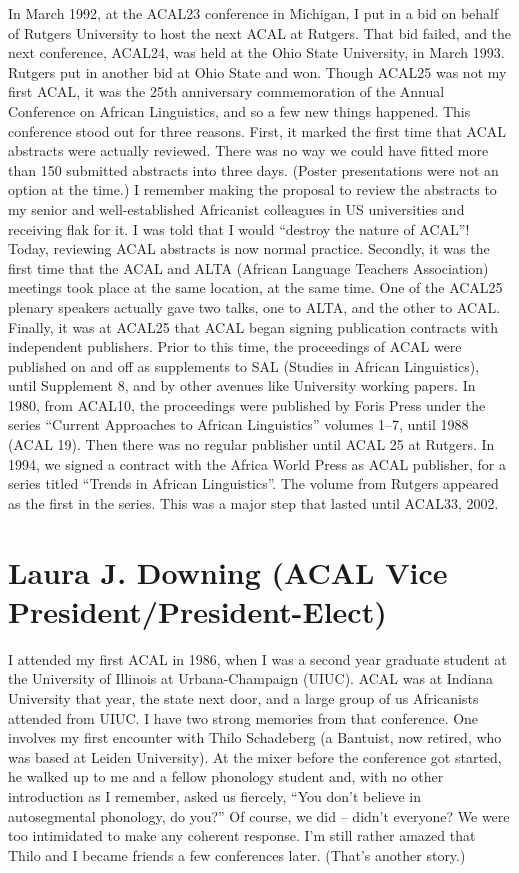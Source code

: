 \documentclass[output=paper]{langscibook}
\begin{document}
In March 1992, at the ACAL23 conference in Michigan, I put in a bid on behalf of Rutgers University to host the next ACAL at Rutgers. That bid failed, and the next conference, ACAL24, was held at the Ohio State University, in March 1993. Rutgers put in another bid at Ohio State and won.
Though ACAL25 was not my first ACAL, it was the 25th anniversary commemoration of the Annual Conference on African Linguistics, and so a few new things happened. This conference stood out for three reasons. First, it marked the first time that ACAL abstracts were actually reviewed. There was no way we could have fitted more than 150 submitted abstracts into three days. (Poster presentations were not an option at the time.) I remember making the proposal to review the abstracts to my senior and well-established Africanist colleagues in US universities and receiving flak for it. I was told that I would “destroy the nature of ACAL”!  Today, reviewing ACAL abstracts is now normal practice.
Secondly, it was the first time that the ACAL and ALTA (African Language Teachers Association) meetings took place at the same location, at the same time. One of the ACAL25 plenary speakers actually gave two talks, one to ALTA, and the other to ACAL.
Finally, it was at ACAL25 that ACAL began signing publication contracts with independent publishers. Prior to this time, the proceedings of ACAL were published on and off as supplements to SAL (Studies in African Linguistics), until Supplement 8, and by other avenues like University working papers. In 1980, from ACAL10, the proceedings were published by Foris Press under the series “Current Approaches to African Linguistics” volumes 1--7, until 1988 (ACAL 19). Then there was no regular publisher until ACAL 25 at Rutgers. In 1994, we signed a contract with the Africa World Press as ACAL publisher, for a series titled “Trends in African Linguistics”. The volume from Rutgers appeared as the first in the series. This was a major step that lasted until ACAL33, 2002.

\section*{Laura J. Downing (ACAL Vice President/President-Elect)}

I attended my first ACAL in 1986, when I was a second year graduate student at the University of Illinois at Urbana-Champaign (UIUC). ACAL was at Indiana University that year, the state next door, and a large group of us Africanists attended from UIUC. I have two strong memories from that conference. One involves my first encounter with Thilo Schadeberg (a Bantuist, now retired, who was based at Leiden University). At the mixer before the conference got started, he walked up to me and a fellow phonology student and, with no other introduction as I remember, asked us fiercely, “You don’t believe in autosegmental phonology, do you?” Of course, we did --  didn’t everyone? We were too intimidated to make any coherent response. I’m still rather amazed that Thilo and I became friends a few conferences later. (That’s another story.)
\end{document}

